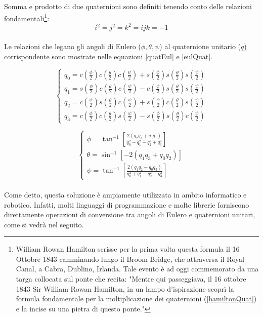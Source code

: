 Somma e prodotto di due quaternioni sono definiti tenendo conto delle relazioni fondamentali\footnote{William Rowan Hamilton scrisse per la prima volta questa formula il 16 Ottobre 1843 camminando lungo il Broom Bridge, che attraversa il Royal Canal, a Cabra, Dublino, Irlanda. Tale evento è ad oggi commemorato da una targa collocata sul ponte che recita: "Mentre qui passeggiava, il 16 ottobre 1843 Sir William Rowan Hamilton, in un lampo d'ispirazione scoprì la formula fondamentale per la moltiplicazione dei quaternioni (\ref{hamiltonQuat}) e la incise su una pietra di questo ponte."}:
\begin{equation}
	 i^2 = j^2 = k^2 = ijk = -1
	 \label{hamiltonQuat}
\end{equation}\\

Le relazioni che legano gli angoli di Eulero ($\phi, \theta, \psi$) al quaternione unitario ($q$) corrispondente sono mostrate nelle equazioni \ref{quatEul} e \ref{eulQuat}.

\begin{equation}
	\begin{cases}
		q_0 = c(\frac{\phi}{2})c(\frac{\theta}{2})c(\frac{\psi}{2}) + s(\frac{\phi}{2})s(\frac{\theta}{2})s(\frac{\psi}{2}) \\
		q_1 = s(\frac{\phi}{2})c(\frac{\theta}{2})c(\frac{\psi}{2}) - c(\frac{\phi}{2})s(\frac{\theta}{2})s(\frac{\psi}{2}) \\
		q_2 = c(\frac{\phi}{2})s(\frac{\theta}{2})c(\frac{\psi}{2}) + s(\frac{\phi}{2})c(\frac{\theta}{2})s(\frac{\psi}{2}) \\
		q_3 = c(\frac{\phi}{2})c(\frac{\theta}{2})s(\frac{\psi}{2}) - s(\frac{\phi}{2})s(\frac{\theta}{2})c(\frac{\psi}{2})
	\end{cases}
	\label{quatEul}
\end{equation}

\begin{equation}
	\begin{cases}
		\phi = \tan^{-1} \left[\frac{2(q_2q_3 + q_0q_1)}{q_0^2 - q_1^2 - q_2^2 + q_3^2}\right] \\
		\theta = \sin^{-1} \left[-2(q_1q_3 + q_0q_2)\right] \\
		\psi = \tan^{-1} \left[\frac{2(q_1q_2 + q_0q_3)}{q_0^2 + q_1^2 - q_2^2 - q_3^2}\right]
	\end{cases}
	\label{eulQuat}
\end{equation}\\

Come detto, questa soluzione è ampiamente utilizzata in ambito informatico e robotico. Infatti, molti linguaggi di programmazione e molte librerie forniscono direttamente operazioni di conversione tra angoli di Eulero e quaternioni unitari, come si vedrà nel seguito.

